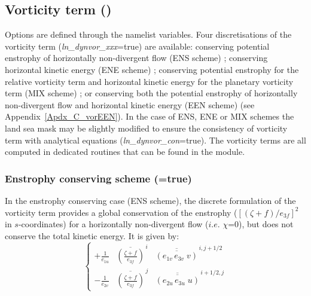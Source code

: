 \subsection   [Vorticity term (\textit{dynvor}) ]
			{Vorticity term ()}
\label{DYN_vor}

Options are defined through the  namelist variables.
Four discretisations of the vorticity term (\textit{ln\_dynvor\_xxx}=true) are available: 
conserving potential enstrophy of horizontally non-divergent flow (ENS scheme) ; 
conserving horizontal kinetic energy (ENE scheme) ; conserving potential enstrophy for 
the relative vorticity term and horizontal kinetic energy for the planetary vorticity 
term (MIX scheme) ; or conserving both the potential enstrophy of horizontally non-divergent 
flow and horizontal kinetic energy (EEN scheme) (see  Appendix~\ref{Apdx_C_vorEEN}). In the 
case of ENS, ENE or MIX schemes the land sea mask may be slightly modified to ensure the 
consistency of vorticity term with analytical equations (\textit{ln\_dynvor\_con}=true).
The vorticity terms are all computed in dedicated routines that can be found in 
the  module.

\subsubsection{Enstrophy conserving scheme (=true)}
\label{DYN_vor_ens}

In the enstrophy conserving case (ENS scheme), the discrete formulation of the 
vorticity term provides a global conservation of the enstrophy 
($ [ (\zeta +f ) / e_{3f} ]^2 $ in $s$-coordinates) for a horizontally non-divergent 
flow ($i.e.$ $\chi$=$0$), but does not conserve the total kinetic energy. It is given by:
\begin{equation} \label{Eq_dynvor_ens}
\left\{ 
\begin{aligned}
{+\frac{1}{e_{1u} } } & {\overline {\left( { \frac{\zeta +f}{e_{3f} }} \right)} }^{\,i} 
                                & {\overline{\overline {\left( {e_{1v}\,e_{3v}\;v} \right)}} }^{\,i, j+1/2}    \\
{- \frac{1}{e_{2v} } } & {\overline {\left( {\frac{\zeta +f}{e_{3f} }} \right)} }^{\,j}  
                                & {\overline{\overline {\left( {e_{2u}\,e_{3u}\;u} \right)}} }^{\,i+1/2, j}  
\end{aligned} 
 \right.
\end{equation} 

